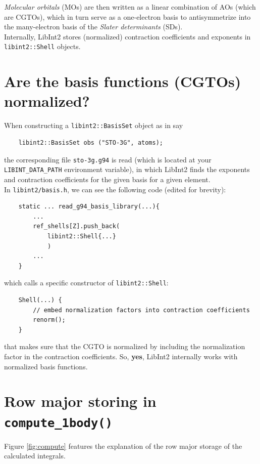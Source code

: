 \documentclass[12pt]{article}
\begin{document}
    \textit{Molecular orbitals} (MOs) are then written as a linear combination of AOs (which are CGTOs), which in turn serve as a one-electron basis to antisymmetrize into the many-electron basis of the \textit{Slater determinants} (SDs). \cite{jensen2007} \\

    Internally, LibInt2 stores (normalized) contraction coefficients and exponents in \lstinline{libint2::Shell} objects.

\section{Are the basis functions (CGTOs) normalized?}

    When constructing a \lstinline{libint2::BasisSet} object as in say

    \begin{lstlisting}
    libint2::BasisSet obs ("STO-3G", atoms);
    \end{lstlisting}

    the corresponding file \lstinline{sto-3g.g94} is read (which is located at your \lstinline{LIBINT_DATA_PATH} environment variable), in which LibInt2 finds the exponents and contraction coefficients for the given basis for a given element. \\

    In \lstinline{libint2/basis.h}, we can see the following code (edited for brevity):

    \begin{lstlisting}
    static ... read_g94_basis_library(...){
        ...
        ref_shells[Z].push_back(
            libint2::Shell{...}
            )
        ...
    }
    \end{lstlisting}

    which calls a specific constructor of \lstinline{libint2::Shell}:

    \begin{lstlisting}
    Shell(...) {
        // embed normalization factors into contraction coefficients
        renorm();
    }
    \end{lstlisting}

    that makes sure that the CGTO is normalized by including the normalization factor in the contraction coefficients. So, \textbf{yes}, LibInt2 internally works with normalized basis functions.

\section{Row major storing in \lstinline{compute_1body()}}
    Figure \ref{fig:compute} features the explanation of the row major storage of the calculated integrals.
\end{document}
